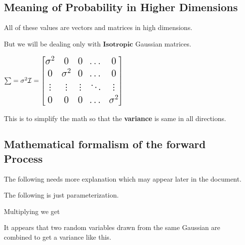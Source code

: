 \documentclass[../../../include/open-logic-chapter]{subfiles}
\begin{document}


\subsection{Meaning of Probability in Higher Dimensions}

All of these values are vectors and matrices in high dimensions.


But we will be dealing only with $\textbf{Isotropic}$ Gaussian matrices.

$\Large \sum = {\sigma}^{2}\mathcal{I} = \begin{bmatrix} {\sigma}^{2} & 0 & 0 & \dots  & 0 \\
    0 & {\sigma}^{2} & 0 & \dots  & 0 \\ \vdots & \vdots & \vdots & \ddots & \vdots \\ 0 & 0 & 0 & \dots  & {\sigma}^{2} \end{bmatrix} $

This is to simplify the math so that the \textbf{variance} is same in all directions.

\subsection{Mathematical formalism of the forward Process}


The following needs more explanation which may appear later in the document.

The following is just parameterization.


Multiplying we get




It appears that two random variables drawn from the same Gaussian are combined to get a variance like this.
\end{document}
